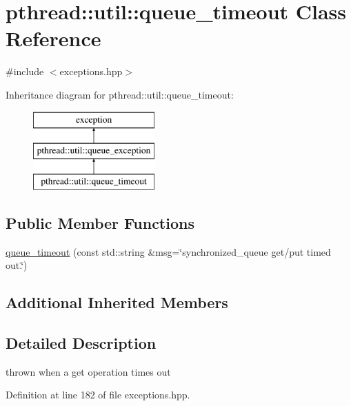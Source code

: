 \hypertarget{classpthread_1_1util_1_1queue__timeout}{\section{pthread\+:\+:util\+:\+:queue\+\_\+timeout Class Reference}
\label{classpthread_1_1util_1_1queue__timeout}
}


{\ttfamily \#include $<$exceptions.\+hpp$>$}

Inheritance diagram for pthread\+:\+:util\+:\+:queue\+\_\+timeout\+:\begin{figure}[H]
\begin{center}
\leavevmode
\includegraphics[height=3.000000cm]{classpthread_1_1util_1_1queue__timeout}
\end{center}
\end{figure}
\subsection*{Public Member Functions}
\begin{DoxyCompactItemize}
\item 
\hyperlink{classpthread_1_1util_1_1queue__timeout_a9bbc5bcc7fba68aceb1aec4d4b922b74}{queue\+\_\+timeout} (const std\+::string \&msg=\char`\"{}synchronized\+\_\+queue get/put timed out.\char`\"{})
\end{DoxyCompactItemize}
\subsection*{Additional Inherited Members}


\subsection{Detailed Description}
thrown when a get operation times out 

Definition at line 182 of file exceptions.\+hpp.



